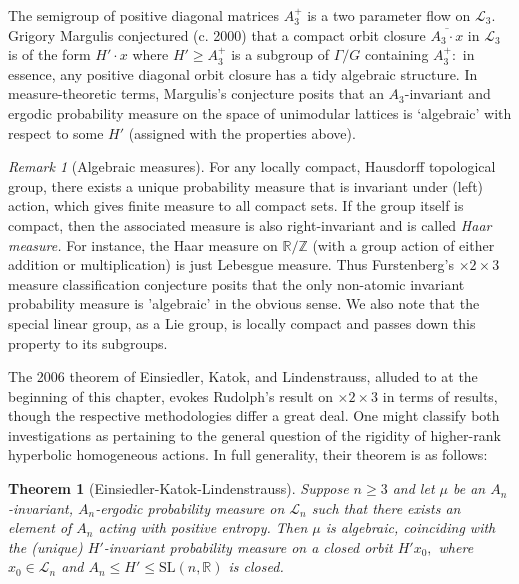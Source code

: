 \documentclass[12pt, letterpaper, oneside]{book}
\newcommand{\R}{\mathbb{R}}
\newcommand{\Z}{\mathbb{Z}}
\theoremstyle{plain}
\newtheorem{theorem}{Theorem}
\theoremstyle{definition}
\theoremstyle{remark}
\newtheorem*{remark}{Remark}
\begin{document}
The semigroup of positive diagonal matrices $A_3^+$ is a two parameter flow on $\mathcal{L}_3.$  Grigory Margulis conjectured (c. 2000) that a compact orbit closure $\overline{A_3\cdot x}$ in $\mathcal{L}_3$ is of the form $H'\cdot x$ where $H' \geq A_3^+$ is a subgroup of $\Gamma /G$ containing $A_3^+:$ in essence, any positive diagonal orbit closure has a tidy algebraic structure. In measure-theoretic terms, Margulis's conjecture posits that an $A_3$-invariant and ergodic probability measure on the space of unimodular lattices is `algebraic' with respect to some $H'$ (assigned with the properties above). 

\begin{remark}[Algebraic measures]
For any locally compact, Hausdorff topological group, there exists a unique probability measure that is invariant under (left) action, which gives finite measure to all compact sets. If the group itself is compact, then the associated measure is also right-invariant and is called \textit{Haar measure.} For instance, the Haar measure on $\R/\Z$ (with a group action of either addition or multiplication) is just Lebesgue measure. Thus Furstenberg's $\times2\times3$ measure classification conjecture posits that the only non-atomic invariant probability measure is 'algebraic' in the obvious sense. We also note that the special linear group, as a Lie group, is locally compact and passes down this property to its subgroups.
\end{remark}

The 2006 theorem of Einsiedler, Katok, and Lindenstrauss, alluded to at the beginning of this chapter, evokes Rudolph's result on $\times2\times3$ in terms of results, 
though the respective methodologies differ a great deal.  One might classify both investigations as pertaining to the general question of the rigidity of higher-rank hyperbolic homogeneous actions. In full generality, their theorem is as follows: 
\begin{theorem}[Einsiedler-Katok-Lindenstrauss]
Suppose $n \geq 3$ and let $\mu$ be an $A_n$-invariant, $A_n$-ergodic probability measure on $\mathcal{L}_n$ such that there exists an element of $A_n$ acting with positive entropy. Then $\mu$ is algebraic, coinciding with the (unique) $H'$-invariant probability measure on a closed orbit $H'x_0,$ where $x_0 \in \mathcal{L}_n$ and $A_n \leq H' \leq \mbox{SL}(n, \R)$ is closed.
\end{theorem}
\end{document}
